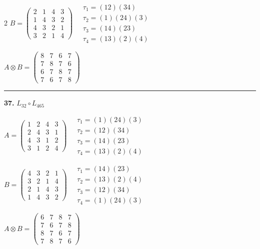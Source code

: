 \begin{multicols}{2}
$B = \begin{pmatrix} 2 & 1 & 4 & 3 \\ 1 & 4 & 3 & 2 \\ 4 & 3 & 2 & 1 \\ 3 & 2 & 1 & 4 \end{pmatrix} \quad \begin{matrix} \tau_{1}=(1 2)(3 4) \\ \tau_{2}=(1)(2 4)(3) \\ \tau_{3}=(1 4)(2 3) \\ \tau_{4}=(1 3)(2)(4) \end{matrix}$

$A \otimes B = \begin{pmatrix} 8 & 7 & 6 & 7 \\ 7 & 8 & 7 & 6 \\ 6 & 7 & 8 & 7 \\ 7 & 6 & 7 & 8 \end{pmatrix}$

\vspace{0.3em}
\hrule
\vspace{0.3em}

\noindent\textbf{37.} $L_{32} \circ L_{465}$

$A = \begin{pmatrix} 1 & 2 & 4 & 3 \\ 2 & 4 & 3 & 1 \\ 4 & 3 & 1 & 2 \\ 3 & 1 & 2 & 4 \end{pmatrix} \quad \begin{matrix} \tau_{1}=(1)(2 4)(3) \\ \tau_{2}=(1 2)(3 4) \\ \tau_{3}=(1 4)(2 3) \\ \tau_{4}=(1 3)(2)(4) \end{matrix}$

$B = \begin{pmatrix} 4 & 3 & 2 & 1 \\ 3 & 2 & 1 & 4 \\ 2 & 1 & 4 & 3 \\ 1 & 4 & 3 & 2 \end{pmatrix} \quad \begin{matrix} \tau_{1}=(1 4)(2 3) \\ \tau_{2}=(1 3)(2)(4) \\ \tau_{3}=(1 2)(3 4) \\ \tau_{4}=(1)(2 4)(3) \end{matrix}$

$A \otimes B = \begin{pmatrix} 6 & 7 & 8 & 7 \\ 7 & 6 & 7 & 8 \\ 8 & 7 & 6 & 7 \\ 7 & 8 & 7 & 6 \end{pmatrix}$


\end{multicols}
